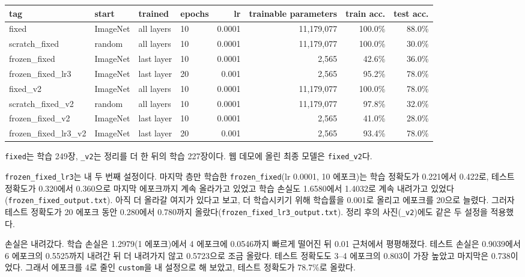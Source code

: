 \documentclass[11pt]{article}
\begin{document}
\begin{center}\footnotesize
\begin{tabular}{llllrrrr}
\toprule
tag & start & trained & epochs & lr & trainable parameters & train acc. & test acc. \\
\midrule
fixed & ImageNet & all layers & 10 & 0.0001 & 11,179,077 & 100.0\% & 88.0\% \\
scratch\_fixed & random & all layers & 10 & 0.0001 & 11,179,077 & 100.0\% & 30.0\% \\
frozen\_fixed & ImageNet & last layer & 10 & 0.0001 & 2,565 & 42.6\% & 36.0\% \\
frozen\_fixed\_lr3 & ImageNet & last layer & 20 & 0.001 & 2,565 & 95.2\% & 78.0\% \\
fixed\_v2 & ImageNet & all layers & 10 & 0.0001 & 11,179,077 & 100.0\% & 78.0\% \\
scratch\_fixed\_v2 & random & all layers & 10 & 0.0001 & 11,179,077 & 97.8\% & 32.0\% \\
frozen\_fixed\_v2 & ImageNet & last layer & 10 & 0.0001 & 2,565 & 41.0\% & 28.0\% \\
frozen\_fixed\_lr3\_v2 & ImageNet & last layer & 20 & 0.001 & 2,565 & 93.4\% & 78.0\% \\
\bottomrule
\end{tabular}
\end{center}
\texttt{fixed}는 학습 249장, \texttt{\_v2}는 정리를 더 한 뒤의 학습 227장이다. 웹 데모에 올린 최종 모델은 \texttt{fixed\_v2}다.

\texttt{frozen\_fixed\_lr3}는 내 두 번째 설정이다. 마지막 층만 학습한 \texttt{frozen\_fixed}(lr 0.0001, 10 에포크)는 학습 정확도가 0.221에서 0.422로, 테스트 정확도가 0.320에서 0.360으로 마지막 에포크까지 계속 올라가고 있었고 학습 손실도 1.6580에서 1.4032로 계속 내려가고 있었다(\texttt{frozen\_fixed\_output.txt}). 아직 더 올라갈 여지가 있다고 보고, 더 학습시키기 위해 학습률을 0.001로 올리고 에포크를 20으로 늘렸다. 그러자 테스트 정확도가 20 에포크 동안 0.280에서 0.780까지 올랐다(\texttt{frozen\_fixed\_lr3\_output.txt}). 정리 후의 사진(\texttt{\_v2})에도 같은 두 설정을 적용했다.


손실은 내려갔다. 학습 손실은 1.2979(1 에포크)에서 4 에포크에 0.0546까지 빠르게 떨어진 뒤 0.01 근처에서 평평해졌다. 테스트 손실은 0.9039에서 6 에포크의 0.5525까지 내려간 뒤 더 내려가지 않고 0.5723으로 조금 올랐다. 테스트 정확도도 3--4 에포크의 0.803이 가장 높았고 마지막은 0.738이었다. 그래서 에포크를 4로 줄인 \texttt{custom}을 내 설정으로 해 보았고, 테스트 정확도가 78.7\%로 올랐다.
\end{document}
